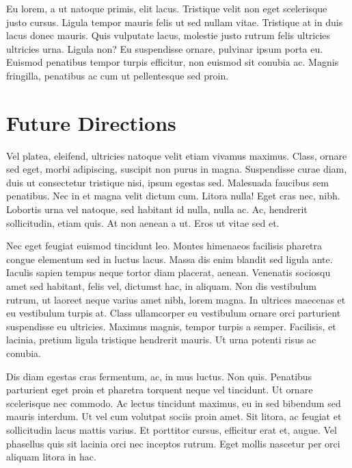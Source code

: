 \documentclass[]{article}
\begin{document}
Eu lorem, a ut natoque primis, elit lacus. Tristique velit non eget
scelerisque justo cursus. Ligula tempor mauris felis ut sed nullam
vitae. Tristique at in duis lacus donec mauris. Quis vulputate lacus,
molestie justo rutrum felis ultricies ultricies urna. Ligula non? Eu
suspendisse ornare, pulvinar ipsum porta eu. Euismod penatibus tempor
turpis efficitur, non euismod sit conubia ac. Magnis fringilla,
penatibus ac cum ut pellentesque sed proin.

\hypertarget{future-directions}{%
\section{Future Directions}\label{future-directions}}

Vel platea, eleifend, ultricies natoque velit etiam vivamus maximus.
Class, ornare sed eget, morbi adipiscing, suscipit non purus in magna.
Suspendisse curae diam, duis ut consectetur tristique nisi, ipsum
egestas sed. Malesuada faucibus sem penatibus. Nec in et magna velit
dictum cum. Litora nulla! Eget cras nec, nibh. Lobortis urna vel
natoque, sed habitant id nulla, nulla ac. Ac, hendrerit sollicitudin,
etiam quis. At non aenean a ut. Eros ut vitae sed et.

Nec eget feugiat euismod tincidunt leo. Montes himenaeos facilisis
pharetra congue elementum sed in luctus lacus. Massa dis enim blandit
sed ligula ante. Iaculis sapien tempus neque tortor diam placerat,
aenean. Venenatis sociosqu amet sed habitant, felis vel, dictumst hac,
in aliquam. Non dis vestibulum rutrum, ut laoreet neque varius amet
nibh, lorem magna. In ultrices maecenas et eu vestibulum turpis at.
Class ullamcorper eu vestibulum ornare orci parturient suspendisse eu
ultricies. Maximus magnis, tempor turpis a semper. Facilisis, et
lacinia, pretium ligula tristique hendrerit mauris. Ut urna potenti
risus ac conubia.

Dis diam egestas cras fermentum, ac, in mus luctus. Non quis. Penatibus
parturient eget proin et pharetra torquent neque vel tincidunt. Ut
ornare scelerisque nec commodo. Ac lectus tincidunt maximus, eu in sed
bibendum sed mauris interdum. Ut vel cum volutpat sociis proin amet. Sit
litora, ac feugiat et sollicitudin lacus mattis varius. Et porttitor
cursus, efficitur erat et, augue. Vel phasellus quis sit lacinia orci
nec inceptos rutrum. Eget mollis nascetur per orci aliquam litora in
hac.
\end{document}
